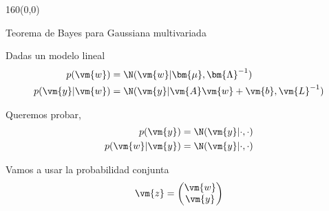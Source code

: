 \documentclass[shownotes,aspectratio=169]{beamer}
\begin{document}
\begin{frame}[plain]
 \begin{textblock}{160}(0,0)
\begin{center}
 \Large Teorema de Bayes para Gaussiana multivariada
\end{center}
\end{textblock}
\vspace{0.75cm}

Dadas un modelo lineal
\begin{align*}
    p(\vm{w}) &=  \N(\vm{w}|\bm{\mu},\bm{\Lambda}^{-1}) \\
   p(\vm{y}|\vm{w}) &=  \N(\vm{y}|\vm{A}\vm{w}+\vm{b},\vm{L}^{-1})    
\end{align*}

\pause

Queremos probar,  
\begin{align*}
    p(\vm{y}) &=  \N(\vm{y}|\cdot,\cdot) \\ %
   p(\vm{w}|\vm{y}) &=  \N(\vm{y}|\cdot,\cdot) %
\end{align*}

\pause 

Vamos a usar la probabilidad conjunta
\begin{align*}
 \vm{z} = \begin{pmatrix} \vm{w} \\ \vm{y}  \end{pmatrix}
\end{align*}

% 

\end{frame}
\end{document}
